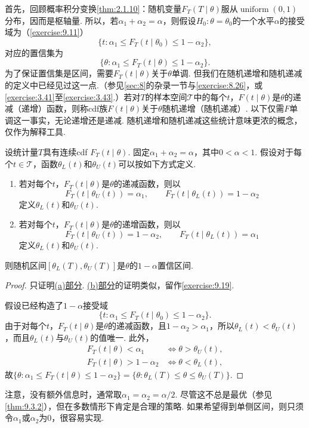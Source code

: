 首先，回顾概率积分变换\autoref{thm:2.1.10}：随机变量$F_T(T\mid\theta)$服从$\operatorname{uniform}(0,1)$分布，因而是枢轴量. 所以，若$\alpha_1+\alpha_2=\alpha$，则假设$H_0:\theta=\theta_0$的一个水平$\alpha$的接受域为（\autoref{exercise:9.11}）
$$\{t:\alpha_1\le F_T(t\mid\theta_0)\le1-\alpha_2\},$$
对应的置信集为
$$\{\theta:\alpha_1\le F_T(t\mid\theta)\le1-\alpha_2\}.$$
为了保证置信集是区间，需要$F_T(t\mid\theta)$关于$\theta$单调. 但我们在随机递增和随机递减的定义中已经见过这一点.（参见\autoref{sec:8}的杂录一节与\autoref{exercise:8.26}，或\autoref{exercise:3.41}至\autoref{exercise:3.43}.）若对$T$的样本空间$\mathcal T$中的每个$t$，$F(t\mid\theta)$是$\theta$的递减（递增）函数，则称cdf族$F(t\mid\theta)$关于$\theta$随机递增（随机递减）. 以下仅需$F$单调这一事实，无论递增还是递减. 随机递增和随机递减这些统计意味更浓的概念，仅作为解释工具.
\begin{theorem}[对连续cdf作枢轴变换]\label{thm:9.2.12}
设统计量$T$具有连续cdf $F_T(t\mid\theta)$. 固定$\alpha_1+\alpha_2=\alpha$，其中$0<\alpha<1$. 假设对于每个$t\in\mathcal T$，函数$\theta_L(t)$和$\theta_U(t)$可以按如下方式定义.
\begin{enumerate}[label=\roman*.]
\item\label{item:9.2.12.i}若对每个$t$，$F_T(t\mid\theta)$是$\theta$的递减函数，则以
$$F_T(t\mid\theta_U(t))=\alpha_1,\qquad F_T(t\mid\theta_L(t))=1-\alpha_2$$
定义$\theta_L(t)$和$\theta_U(t)$.
\item\label{item:9.2.12.ii}若对每个$t$，$F_T(t\mid\theta)$是$\theta$的递增函数，则以
$$F_T(t\mid\theta_U(t))=1-\alpha_2,\qquad F_T(t\mid\theta_L(t))=\alpha_1$$
定义$\theta_L(t)$和$\theta_U(t)$.
\end{enumerate}
则随机区间$[\theta_L(T),\theta_U(T)]$是$\theta$的$1-\alpha$置信区间.
\end{theorem}
\begin{proof}
只证明\hyperref[item:9.2.12.i]{(a)部分}. \hyperref[item:9.2.12.ii]{(b)部分}的证明类似，留作\autoref{exercise:9.19}.

假设已经构造了$1-\alpha$接受域
$$\{t:\alpha_1\le F_T(t\mid\theta_0)\le1-\alpha_2\}.$$
由于对每个$t$，$F_T(t\mid\theta)$是$\theta$的递减函数，且$1-\alpha_2>\alpha_1$，所以$\theta_L(t)<\theta_U(t)$，而且$\theta_L(t)$与$\theta_U(t)$的值唯一. 此外，
$$\begin{aligned}
F_T(t\mid\theta)<\alpha_1&\iff\theta>\theta_U(t),\\
F_T(t\mid\theta)>1-\alpha_2&\iff\theta<\theta_L(t),
\end{aligned}$$
故$\{\theta:\alpha_1\le F_T(t\mid\theta)\le1-\alpha_2\}=\{\theta:\theta_L(T)\le\theta\le\theta_U(T)\}$.
\end{proof}
注意，没有额外信息时，通常取$\alpha_1=\alpha_2=\alpha/2$. 尽管这不总是最优（参见\autoref{thm:9.3.2}），但在多数情形下肯定是合理的策略. 如果希望得到单侧区间，则只须令$\alpha_1$或$\alpha_2$为$0$，很容易实现.

